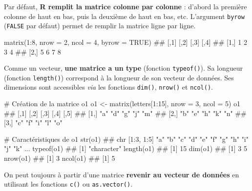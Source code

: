 \documentclass[12pt,twosided, notitlepage]{book}
\newenvironment{Shaded}{}{}
\newcommand{\KeywordTok}[1]{\textcolor[rgb]{0.00,0.00,1.00}{{#1}}}
\newcommand{\DataTypeTok}[1]{{#1}}
\newcommand{\DecValTok}[1]{{#1}}
\newcommand{\StringTok}[1]{\textcolor[rgb]{0.00,0.50,0.50}{{#1}}}
\newcommand{\CommentTok}[1]{\textcolor[rgb]{0.00,0.50,0.00}{{#1}}}
\newcommand{\OtherTok}[1]{\textcolor[rgb]{1.00,0.25,0.00}{{#1}}}
\newcommand{\NormalTok}[1]{{#1}}
\renewenvironment{Shaded}{\begin{snugshade}}{\end{snugshade}}
\begin{document}
Par défaut, \textbf{R remplit la matrice colonne par colonne} : d'abord
la première colonne de haut en bas, puis la deuxième de haut en bas,
etc. L'argument \texttt{byrow} (\texttt{FALSE} par défaut) permet de
remplir la matrice ligne par ligne.

\begin{Shaded}
\begin{Highlighting}[]
\KeywordTok{matrix}\NormalTok{(}\DecValTok{1}\NormalTok{:}\DecValTok{8}\NormalTok{, }\DataTypeTok{nrow =} \DecValTok{2}\NormalTok{, }\DataTypeTok{ncol =} \DecValTok{4}\NormalTok{, }\DataTypeTok{byrow =} \OtherTok{TRUE}\NormalTok{)}
  \NormalTok{##      [,1] [,2] [,3] [,4]}
  \NormalTok{## [1,]    1    2    3    4}
  \NormalTok{## [2,]    5    6    7    8}
\end{Highlighting}
\end{Shaded}

Comme un vecteur, \textbf{une matrice a un type} (fonction
\texttt{typeof()}). Sa longueur (fonction
\texttt{length()}) correspond à la longueur de
son vecteur de données. Ses dimensions sont accessibles \emph{via} les
fonctions \texttt{dim()},
\texttt{nrow()} et
\texttt{ncol()}.

\begin{Shaded}
\begin{Highlighting}[]
\CommentTok{# Création de la matrice o1}
\NormalTok{o1 <-}\StringTok{ }\KeywordTok{matrix}\NormalTok{(letters[}\DecValTok{1}\NormalTok{:}\DecValTok{15}\NormalTok{], }\DataTypeTok{nrow =} \DecValTok{3}\NormalTok{, }\DataTypeTok{ncol =} \DecValTok{5}\NormalTok{)}
\NormalTok{o1}
  \NormalTok{##      [,1] [,2] [,3] [,4] [,5]}
  \NormalTok{## [1,] "a"  "d"  "g"  "j"  "m" }
  \NormalTok{## [2,] "b"  "e"  "h"  "k"  "n" }
  \NormalTok{## [3,] "c"  "f"  "i"  "l"  "o"}

\CommentTok{# Caractéristiques de o1}
\KeywordTok{str}\NormalTok{(o1)}
  \NormalTok{##  chr [1:3, 1:5] "a" "b" "c" "d" "e" "f" "g" "h" "i" "j" "k" ...}
\KeywordTok{typeof}\NormalTok{(o1)}
  \NormalTok{## [1] "character"}
\KeywordTok{length}\NormalTok{(o1)}
  \NormalTok{## [1] 15}
\KeywordTok{dim}\NormalTok{(o1)}
  \NormalTok{## [1] 3 5}
\KeywordTok{nrow}\NormalTok{(o1)}
  \NormalTok{## [1] 3}
\KeywordTok{ncol}\NormalTok{(o1)}
  \NormalTok{## [1] 5}
\end{Highlighting}
\end{Shaded}

On peut toujours à partir d'une matrice \textbf{revenir au vecteur de
données} en utilisant les fonctions \texttt{c()} ou
\texttt{as.vector()}.
\end{document}
